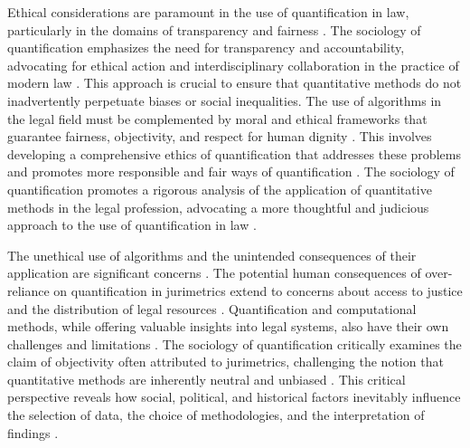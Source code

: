 Ethical considerations are paramount in the use of quantification in law, particularly in the domains of transparency and fairness \cite{10.1057/s41599-020-00557-0,10.1057/s41599-020-0396-5}. The sociology of quantification emphasizes the need for transparency and accountability, advocating for ethical action and interdisciplinary collaboration in the practice of modern law \cite{10.1007/s11186-021-09453-1,salais2016quantification}. This approach is crucial to ensure that quantitative methods do not inadvertently perpetuate biases or social inequalities. The use of algorithms in the legal field must be complemented by moral and ethical frameworks that guarantee fairness, objectivity, and respect for human dignity \cite{10.1590/dados.2022.65.3.267,salais2016quantification}. This involves developing a comprehensive ethics of quantification that addresses these problems and promotes more responsible and fair ways of quantification \cite{10.1057/s41599-020-0396-5,10.1057/s41599-020-00557-0}. The sociology of quantification promotes a rigorous analysis of the application of quantitative methods in the legal profession, advocating a more thoughtful and judicious approach to the use of quantification in law \cite{10.1007/s11186-021-09453-1,salais2016quantification}.

The unethical use of algorithms and the unintended consequences of their application are significant concerns \cite{10.1057/s41599-020-0396-5,10.1057/s41599-020-00557-0}. The potential human consequences of over-reliance on quantification in jurimetrics extend to concerns about access to justice and the distribution of legal resources \cite{10.1057/s41599-020-0396-5,de2010jurimetrics,10.1590/dados.2022.65.3.267,1023071190721,10.3390/fi9040068,10.2307/2654208,demortain2019politics,10.5040/9781350220645,10.1080/07329113.2015.1046739,10.1007/s11186-021-09453-1,10.1057/s41599-020-00557-0,comptabilitat0018,salais2016quantification,10.1017/s0003975609000150,10.1017/s0003975609000150,supiot2018,nunes2016jurimetrics,10.1007/s11186-021-09453-1,10.1590/15174522-105471,zabala2019decades}. Quantification and computational methods, while offering valuable insights into legal systems, also have their own challenges and limitations \cite{10.1590/dados.2022.65.3.267,10.1057/s41599-020-00557-0}. The sociology of quantification critically examines the claim of objectivity often attributed to jurimetrics, challenging the notion that quantitative methods are inherently neutral and unbiased \cite{10.1590/dados.2022.65.3.267,10.1057/s41599-020-00557-0}. This critical perspective reveals how social, political, and historical factors inevitably influence the selection of data, the choice of methodologies, and the interpretation of findings \cite{10.1590/dados.2022.65.3.267,salais2016quantification}.

